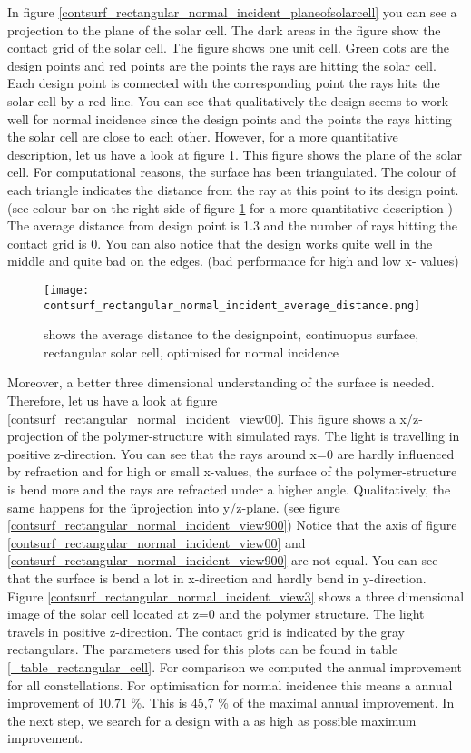 In figure \ref{contsurf_rectangular_normal_incident_planeofsolarcell} you can see a projection to the plane of the solar cell. The dark areas in the figure show the contact grid of the solar cell. The figure shows one unit cell. Green dots are the design points and red points are the points the rays are hitting the solar cell. Each design point is connected with the corresponding point the rays hits the solar cell by a red line. You can see that qualitatively the design seems to work well for normal incidence since the design points and the points the rays hitting the solar cell are close to each other. However, for a more quantitative description, let us have a look at figure \ref{contsurf_rectangular_normal_incident_average_distance}. This figure shows the plane of the solar cell. For computational reasons, the surface has been triangulated. The colour of each triangle indicates the distance from the ray at this point to its design point. (see colour-bar on the right side of figure \ref{contsurf_rectangular_normal_incident_average_distance} for a more quantitative description ) The average distance from design point is 1.3 and the number of rays hitting the contact grid is 0. You can also notice that the design works quite well in the middle and quite bad on the edges. (bad performance for high and low x- values) 

\begin{figure}[h]
\centering
\texttt{[image: contsurf\_rectangular\_normal\_incident\_average\_distance.png]}
\caption{shows the average distance to the designpoint, continuopus surface, rectangular solar cell, optimised for normal incidence \label{contsurf_rectangular_normal_incident_average_distance}}
\end{figure}


Moreover, a better three dimensional understanding of the surface is needed. Therefore, let us have a look at figure \ref{contsurf_rectangular_normal_incident_view00}. This figure shows a x/z-projection of the polymer-structure with simulated rays. The light is travelling in positive z-direction. You can see that the rays around x=0 are hardly influenced by refraction and for high or small x-values, the surface of the polymer-structure is bend more and the rays are refracted under a higher angle. Qualitatively, the same happens for the üprojection into y/z-plane. (see figure \ref{contsurf_rectangular_normal_incident_view900}) Notice that the axis of figure \ref{contsurf_rectangular_normal_incident_view00} and \ref{contsurf_rectangular_normal_incident_view900} are not equal. You can see that the surface is bend a lot in x-direction and hardly bend in y-direction.  
Figure \ref{contsurf_rectangular_normal_incident_view3} shows a three dimensional image of the solar cell located at z=0 and the polymer structure. The light travels in positive z-direction. The contact grid is indicated by the gray rectangulars. 
The parameters used for this plots can be found in table \ref{_table_rectangular_cell}. For comparison we computed the annual improvement for all constellations. For optimisation for normal incidence this means a annual improvement of $10.71$ \%. This is 45,7 \% of the maximal annual improvement. In the next step, we search for a design with a as high as possible maximum improvement. 

